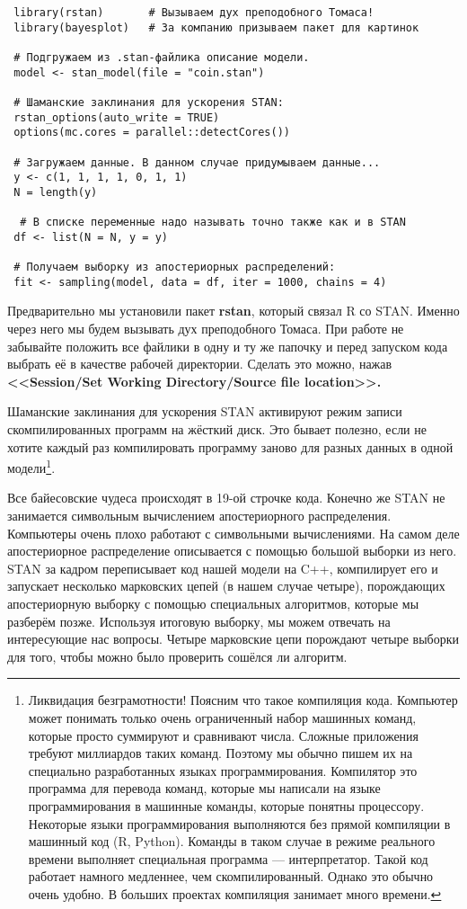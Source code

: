   \begin{verbatim}
 library(rstan)       # Вызываем дух преподобного Томаса!
 library(bayesplot)   # За компанию призываем пакет для картинок
 
 # Подгружаем из .stan-файлика описание модели. 
 model <- stan_model(file = "coin.stan")
 
 # Шаманские заклинания для ускорения STAN:
 rstan_options(auto_write = TRUE)
 options(mc.cores = parallel::detectCores())
 
 # Загружаем данные. В данном случае придумываем данные...
 y <- c(1, 1, 1, 1, 0, 1, 1)
 N = length(y)
 
  # В списке переменные надо называть точно также как и в STAN
 df <- list(N = N, y = y)
 
 # Получаем выборку из апостериорных распределений:
 fit <- sampling(model, data = df, iter = 1000, chains = 4)
  \end{verbatim}
  
Предварительно мы установили пакет \textbf{rstan}, который связал R со STAN. Именно через него мы будем вызывать дух преподобного Томаса.  При работе не забывайте положить все файлики в одну и ту же папочку и перед запуском кода выбрать её в качестве рабочей директории. Сделать это можно, нажав  \textbf{<<Session/Set Working Directory/Source file location>>.} 
 
Шаманские заклинания для ускорения STAN активируют режим записи скомпилированных программ на жёсткий диск. Это бывает полезно, если не хотите каждый раз компилировать программу заново для разных данных в одной модели\footnote{Ликвидация безграмотности! Поясним что такое компиляция кода. Компьютер может понимать только очень ограниченный набор машинных команд, которые просто суммируют и сравнивают числа. Сложные приложения требуют миллиардов таких команд. Поэтому мы обычно пишем их на специально разработанных языках программирования. Компилятор это программа для перевода команд, которые мы написали на языке программирования в машинные команды, которые понятны процессору. Некоторые языки программирования выполняются без прямой компиляции в машинный код (R, Python). Команды в таком случае в режиме реального времени выполняет специальная программа --- интерпретатор. Такой код работает намного медленнее, чем скомпилированный. Однако это обычно очень удобно. В больших проектах компиляция занимает много времени. }.  

Все байесовские чудеса происходят в 19-ой строчке кода. Конечно же STAN не занимается символьным вычислением апостериорного распределения. Компьютеры очень плохо работают с символьными вычислениями. На самом деле апостериорное распределение описывается с помощью большой выборки из него. STAN за кадром переписывает код нашей модели на C++, компилирует его и запускает несколько марковских цепей (в нашем случае четыре), порождающих апостериорную выборку с помощью специальных алгоритмов, которые мы  разберём позже. Используя итоговую выборку, мы можем отвечать на интересующие нас вопросы. Четыре марковские цепи порождают четыре выборки для того, чтобы можно было проверить сошёлся ли алгоритм. 

